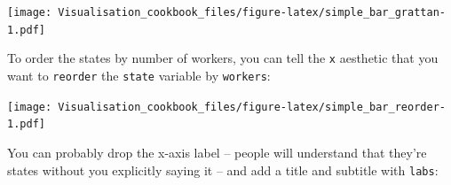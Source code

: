 \documentclass[]{book}
\newenvironment{Shaded}{\begin{snugshade}}{\end{snugshade}}
\newcommand{\CommentTok}[1]{\textcolor[rgb]{0.56,0.35,0.01}{\textit{#1}}}
\newcommand{\DataTypeTok}[1]{\textcolor[rgb]{0.13,0.29,0.53}{#1}}
\newcommand{\KeywordTok}[1]{\textcolor[rgb]{0.13,0.29,0.53}{\textbf{#1}}}
\newcommand{\NormalTok}[1]{#1}
\newcommand{\OperatorTok}[1]{\textcolor[rgb]{0.81,0.36,0.00}{\textbf{#1}}}
\newcommand{\StringTok}[1]{\textcolor[rgb]{0.31,0.60,0.02}{#1}}
\begin{document}
\begin{Shaded}
\end{Shaded}

\texttt{[image: Visualisation\_cookbook\_files/figure-latex/simple\_bar\_grattan-1.pdf]}

To order the states by number of workers, you can tell the \texttt{x} aesthetic that you want to \texttt{reorder} the \texttt{state} variable by \texttt{workers}:

\begin{Shaded}
\end{Shaded}

\texttt{[image: Visualisation\_cookbook\_files/figure-latex/simple\_bar\_reorder-1.pdf]}

You can probably drop the x-axis label -- people will understand that they're states without you explicitly saying it -- and add a title and subtitle with \texttt{labs}:
\end{document}

